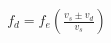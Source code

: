 \documentclass[preview]{standalone}
\begin{document}
\begin{align*}
f_d = f_e \left(\frac{v_s \pm v_d}{v_s}\right)
\end{align*}
\end{document}

